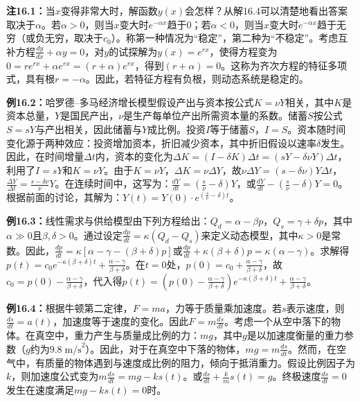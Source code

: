 \begin{translation}
\textbf{注16.1：}当$x$变得非常大时，解函数$y(x)$会怎样？从解16.4可以清楚地看出答案取决于$\alpha$。若$\alpha > 0$，则当$x$变大时$e^{-\alpha x}$趋于$0$；若$\alpha < 0$，则当$x$变大时$e^{-\alpha x}$趋于无穷（或负无穷，取决于$c_0$）。称第一种情况为``稳定''，第二种为``不稳定''。考虑互补方程$\frac{dy}{dx} + \alpha y = 0$，对$y$的试探解为$y(x) = e^{rx}$，使得方程变为$0 = re^{rx} + \alpha e^{rx} = (r + \alpha)e^{rx}$，得到$(r + \alpha) = 0$。这称为齐次方程的特征多项式，具有根$r = -\alpha$。因此，若特征方程有负根，则动态系统是稳定的。

\textbf{例16.2：}哈罗德--多马经济增长模型假设产出与资本按公式$K = \nu Y$相关，其中$K$是资本总量，$Y$是国民产出，$\nu$是生产每单位产出所需资本量的系数。储蓄$S$按公式$S = sY$与产出相关，因此储蓄与$Y$成比例。投资$I$等于储蓄$S$，$I = S$。资本随时间变化源于两种效应：投资增加资本，折旧减少资本，其中折旧假设以速率$\delta$发生。因此，在时间增量$\Delta t$内，资本的变化为$\Delta K = (I - \delta K)\Delta t = (sY - \delta \nu Y)\Delta t$，利用了$I = sY$和$K = \nu Y$。由于$K = \nu Y$，$\Delta K = \nu \Delta Y$，故$\nu \Delta Y = (s - \delta \nu)Y \Delta t$，$\frac{\Delta Y}{\Delta t} = \frac{s - \delta \nu}{\nu} Y$。在连续时间中，这写为：$\frac{dY}{dt} = (\frac{s}{\nu} - \delta) Y$，或$\frac{dY}{dt} - (\frac{s}{\nu} - \delta) Y = 0$。根据前面的讨论，其解为：$Y(t) = Y(0) \cdot e^{(\frac{s}{\nu} - \delta) t}$。

\textbf{例16.3：}线性需求与供给模型由下列方程给出：$Q_d = \alpha - \beta p$，$Q_s = \gamma + \delta p$，其中$\alpha \gg 0$且$\beta, \delta > 0$。通过设定$\frac{dp}{dt} = \kappa(Q_d - Q_s)$来定义动态模型，其中$\kappa > 0$是常数。因此，$\frac{dp}{dt} = \kappa[\alpha - \gamma - (\beta + \delta)p]$或$\frac{dp}{dt} + \kappa(\beta + \delta)p = \kappa(\alpha - \gamma)$。求解得$p(t) = c_0 e^{-\kappa(\beta+\delta)t} + \frac{\alpha - \gamma}{\beta + \delta}$。在$t = 0$处，$p(0) = c_0 + \frac{\alpha - \gamma}{\beta + \delta}$，故$c_0 = p(0) - \frac{\alpha - \gamma}{\beta + \delta}$，代入得$p(t) = (p(0) - \frac{\alpha - \gamma}{\beta + \delta}) e^{-\kappa(\beta+\delta)t} + \frac{\alpha - \gamma}{\beta + \delta}$。

\textbf{例16.4：}根据牛顿第二定律，$F = ma$，力等于质量乘加速度。若$s$表示速度，则$\frac{ds}{dt} = a(t)$，加速度等于速度的变化。因此$F = m\frac{ds}{dt}$。考虑一个从空中落下的物体。在真空中，重力产生与质量成比例的力：$mg$，其中$g$是以加速度衡量的重力参数（$g$约为$9.8\;\text{m/s}^2$）。因此，对于在真空中下落的物体，$mg = m\frac{ds}{dt}$。然而，在空气中，有质量的物体遇到与速度成比例的阻力，倾向于抵消重力。假设比例因子为$k$，则加速度公式变为$m\frac{ds}{dt} = mg - k s(t)$。或$\frac{ds}{dt} + \frac{k}{m}s(t) = g$。终极速度$\frac{ds}{dt} = 0$发生在速度满足$mg - ks(t) = 0$时。


\end{translation}
